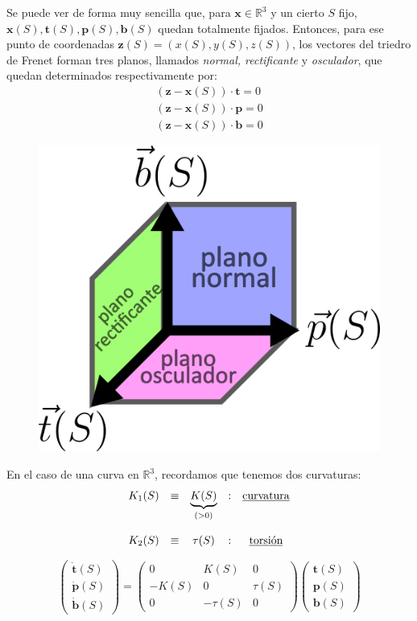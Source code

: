 Se puede ver de forma muy sencilla que, para $\mathbf{x}\in \mathbb{R}^3$ y un cierto $S$ fijo, $\mathbf{x}(S),\mathbf{t}(S),\mathbf{p}(S),\mathbf{b}(S)$ quedan totalmente fijados. Entonces, para ese punto de coordenadas $\mathbf{z}(S)=(x(S),y(S),z(S))$, los vectores del triedro de Frenet forman tres planos, llamados \emph{normal, rectificante }y \emph{osculador}, que quedan determinados respectivamente por:
$$
\begin{array}{c}
     (\mathbf{z}-\mathbf{x}(S))\cdot \mathbf{t}=0  \\
     (\mathbf{z}-\mathbf{x}(S))\cdot \mathbf{p}=0  \\
     (\mathbf{z}-\mathbf{x}(S))\cdot \mathbf{b}=0
\end{array}
$$
\begin{figure}
    \centering
    \includegraphics[scale=.4]{FOTOS/planos_triedro.png}
\end{figure}
En el caso de una curva en $\mathbb{R}^3$, recordamos que tenemos dos curvaturas:
$$
\begin{array}{ccccc}
    K_1(S)&\equiv& \underbrace{K(S)}_{(>0)}  & :&\text{\underline{curvatura}}\\\\
    K_2(S)&\equiv &\tau(S)   &:& \text{\underline{torsión}}
\end{array}
$$

$$
\left ( \begin{array}{c}
     \dot{\mathbf{t}}(S)  \\
     \dot{\mathbf{p}}(S)  \\
     \dot{\mathbf{b}}(S)
\end{array} \right )=\left ( \begin{array}{ccc}
     0&K(S) &0 \\
     -K(S)&0 &\tau (S) \\
     0&-\tau (S) &0
\end{array} \right ) \left ( \begin{array}{c}
     \mathbf{t}(S)  \\
     \mathbf{p}(S)  \\
     \mathbf{b}(S)
\end{array} \right )
$$

